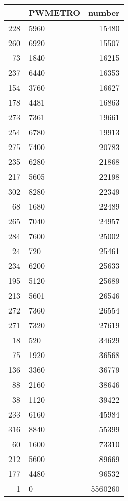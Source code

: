 \begin{table}[ht]
\centering
\begin{tabular}{rlr}
  \hline
 & PWMETRO & number \\ 
  \hline
228 & 5960 & 15480 \\ 
  260 & 6920 & 15507 \\ 
  73 & 1840 & 16215 \\ 
  237 & 6440 & 16353 \\ 
  154 & 3760 & 16627 \\ 
  178 & 4481 & 16863 \\ 
  273 & 7361 & 19661 \\ 
  254 & 6780 & 19913 \\ 
  275 & 7400 & 20783 \\ 
  235 & 6280 & 21868 \\ 
  217 & 5605 & 22198 \\ 
  302 & 8280 & 22349 \\ 
  68 & 1680 & 22489 \\ 
  265 & 7040 & 24957 \\ 
  284 & 7600 & 25002 \\ 
  24 & 720 & 25461 \\ 
  234 & 6200 & 25633 \\ 
  195 & 5120 & 25689 \\ 
  213 & 5601 & 26546 \\ 
  272 & 7360 & 26554 \\ 
  271 & 7320 & 27619 \\ 
  18 & 520 & 34629 \\ 
  75 & 1920 & 36568 \\ 
  136 & 3360 & 36779 \\ 
  88 & 2160 & 38646 \\ 
  38 & 1120 & 39422 \\ 
  233 & 6160 & 45984 \\ 
  316 & 8840 & 55399 \\ 
  60 & 1600 & 73310 \\ 
  212 & 5600 & 89669 \\ 
  177 & 4480 & 96532 \\ 
  1 & 0 & 5560260 \\ 
   \hline
\end{tabular}
\end{table}
